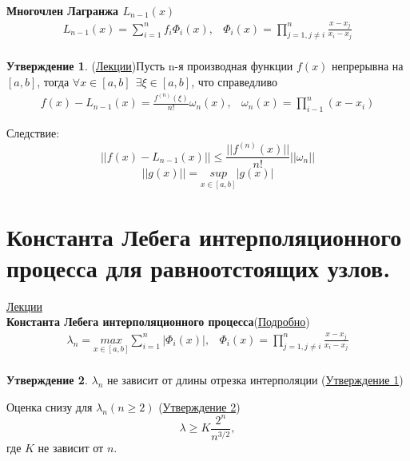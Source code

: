 \documentclass[specialist, subf, href, colorlinks=true, 12pt, times, mtpro, final]{disser}
\theoremstyle{definition}
\newtheorem{state}{Утверждение}[section]
\begin{document}
	\textbf{Многочлен Лагранжа $L_{n - 1}(x)$}
	$$
		\begin {array}{lr}
		L_{n - 1}(x) = \sum\limits_{i = 1}^{n} f_i \Phi_i (x), & \Phi_i(x) = \prod\limits_{j = 1, j\ne i}^{n} \frac{x-x_j}{x_i - x_j} \\
		\end {array}
	$$

	\begin{state}
		(\hyperlink {lects.16}{Лекции})Пусть n-я производная функции $f(x)$ непрерывна на $[a,b]$, тогда $\forall x \in [a,b] \ \  \exists \xi \in [a,b]$, что справедливо
		$$
			\begin{array}{lr}
			f(x) - L_{n-1}(x) = \frac {f^{(n)}(\xi)}{n!} \omega_n(x), & \omega_n(x) = \prod\limits_{i - 1}^{n}(x-x_i)
			\end{array}
		$$
	\end{state}
	Следствие:
	$$
		||f(x) - L_{n-1}(x) || \le \frac{||f^{(n)}(x)||}{n!} ||\omega_n||
	$$
	$$
		||g(x)|| = \underset{x\in [a,b]}{sup} |g(x)|
	$$


\section {Константа Лебега интерполяционного процесса для равноотстоящих узлов.}
	\hyperlink {lects.17}{Лекции}\\
	\textbf{Константа Лебега интерполяционного процесса}(\hyperlink {lects.17}{Подробно})
	$$
		\begin{array}{lr}
		\lambda_n = \underset{x\in [a,b]}{max} \sum\limits_{i = 1}^n |\Phi_i(x)|, & \Phi_i(x) = \prod\limits_{j = 1, j\ne i}^{n} \frac{x-x_j}{x_i - x_j} \\
		\end{array}
	$$
	
	\begin{state}
	$\lambda_n$ не зависит от длины отрезка интерполяции (\hyperlink {lects.17}{Утверждение 1})
	\end{state}
	
	Оценка снизу  для $\lambda_n (n \ge 2)$ (\hyperlink {lects.17}{Утверждение 2})
	$$
		\lambda \ge K \frac {2^n}{n^{3/2}}, 
	$$ 
	где $K$ не зависит от $n$. \\
	
\end{document}
